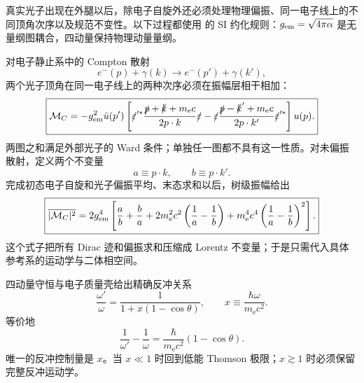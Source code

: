 
真实光子出现在外腿以后，除电子自旋外还必须处理物理偏振、同一电子线上的不同顶角次序以及规范不变性。以下过程都使用 的 SI 约化规则：\(g_{\rm em}=\sqrt{4\pi\alpha}\) 是无量纲图耦合，四动量保持物理动量量纲。

对电子静止系中的 Compton 散射
\begin{equation*}
 e^-(p)+\gamma(k)\to e^-(p')+\gamma(k'),
\end{equation*}
两个光子顶角在同一电子线上的两种次序必须在振幅层相干相加：
\begin{equation}
 \boxed{
 \mathcal M_C
 =-g_{\rm em}^2\bar u(p')\left[
 \slashed\varepsilon'^{*}
 \frac{\slashed p+\slashed k+m_{\mathrm e} c}{2p\cdot k}
 \slashed\varepsilon
 -
 \slashed\varepsilon
 \frac{\slashed p-\slashed k'+m_{\mathrm e} c}{2p\cdot k'}
 \slashed\varepsilon'^{*}
 \right]u(p).}
 \label{eq:compton-M}
\end{equation}
两图之和满足外部光子的 Ward 条件；单独任一图都不具有这一性质。对未偏振散射，定义两个不变量
\begin{equation*}
 a\equiv p\cdot k,\qquad b\equiv p\cdot k'.
\end{equation*}
完成初态电子自旋和光子偏振平均、末态求和以后，树级振幅给出
\begin{equation}
 \boxed{
 \overline{|\mathcal M_C|^2}
 =2g_{\rm em}^4\left[
 \frac ab+\frac ba
 +2m_{\mathrm e}^2c^2\left(\frac1a-\frac1b\right)
 +m_{\mathrm e}^4c^4\left(\frac1a-\frac1b\right)^2
 \right].}
 \label{eq:compton-M2-unpolarized-dp73}
\end{equation}
这个式子把所有 Dirac 迹和偏振求和压缩成 Lorentz 不变量；于是只需代入具体参考系的运动学与二体相空间。

四动量守恒与电子质量壳给出精确反冲关系
\begin{equation}
 \boxed{
 \frac{\omega'}{\omega}
 =\frac{1}{1+x(1-\cos\theta)},
 \qquad
 x\equiv\frac{\hbar\omega}{m_{\mathrm e} c^2}.}
 \label{eq:compton-energy-ratio}
\end{equation}
等价地
\begin{equation}
 \boxed{
 \frac1{\omega'}-\frac1\omega
 =\frac{\hbar}{m_{\mathrm e} c^2}(1-\cos\theta).}
 \label{eq:compton-shift-SI}
\end{equation}
唯一的反冲控制量是 \(x\)。当 \(x\ll1\) 时回到低能 Thomson 极限；\(x\gtrsim1\) 时必须保留完整反冲运动学。


